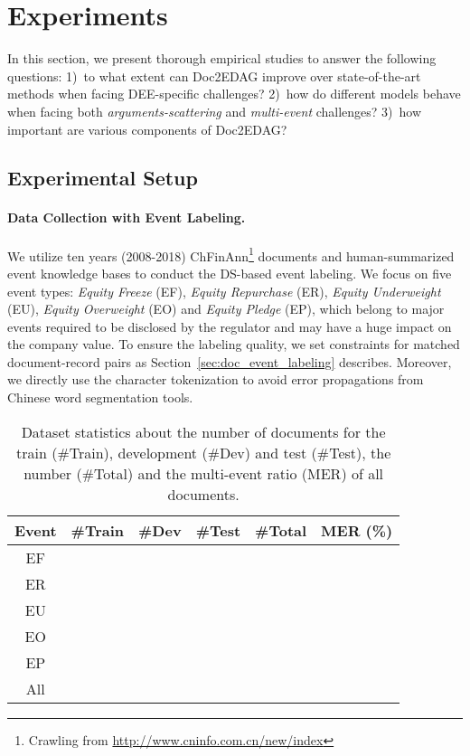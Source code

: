 \documentclass[11pt,a4paper]{article}
\begin{document}
\section{Experiments}
In this section, we present thorough empirical studies to answer the following questions:
1)~to what extent can Doc2EDAG improve over state-of-the-art methods when facing DEE-specific challenges?
2)~how do different models behave when facing both \textit{arguments-scattering} and \textit{multi-event} challenges?
3)~how important are various components of Doc2EDAG?

\subsection{Experimental Setup}

\paragraph{Data Collection with Event Labeling.}
We utilize ten years (2008-2018) ChFinAnn\footnote{Crawling from \url{http://www.cninfo.com.cn/new/index}} documents and human-summarized event knowledge bases to conduct the DS-based event labeling.
We focus on five event types: \textit{Equity Freeze} (EF), \textit{Equity Repurchase} (ER),
\textit{Equity Underweight} (EU), \textit{Equity Overweight} (EO) and \textit{Equity Pledge} (EP),
which belong to major events required to be disclosed by the regulator and may have a huge impact on the company value.
To ensure the labeling quality, we set constraints for matched document-record pairs as Section~\ref{sec:doc_event_labeling} describes.
Moreover, we directly use the character tokenization to avoid error propagations from Chinese word segmentation tools.

\begin{table}[tb]\small
\centering
\addtolength{\tabcolsep}{-1.5pt}
\begin{tabular}{c r r r r r}
\toprule
\textbf{Event} & \textbf{\#Train} & \textbf{\#Dev} & \textbf{\#Test} & \textbf{\#Total} & \textbf{MER (\%)} \\
\midrule
 EF &     &    &    &   &   \\
 ER &   &    &    &   &   \\
 EU &   &    &    &   &   \\
 EO &   &    &  &   &   \\
 EP &  &  &  &  &   \\ 
\midrule
All &  &  &  &  &  \\
\bottomrule
\end{tabular}
\caption{Dataset statistics about the number of documents for the train (\#Train), development (\#Dev) and test (\#Test), the number (\#Total) and the multi-event ratio (MER) of all documents.}
\label{tab:dataset}
\end{table}
\end{document}
